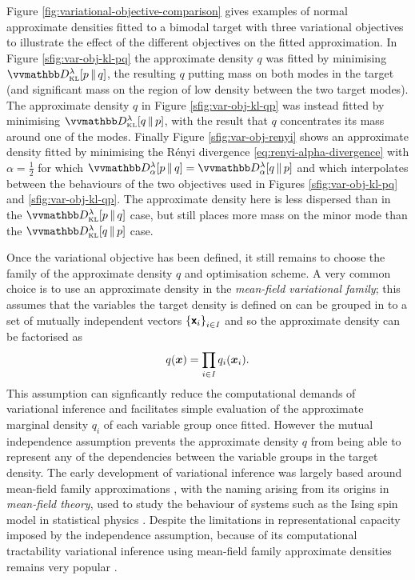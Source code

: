 Figure \ref{fig:variational-objective-comparison} gives examples of normal approximate densities fitted to a bimodal target with three variational objectives to illustrate the effect of the different objectives on the fitted approximation. In Figure \ref{sfig:var-obj-kl-pq} the approximate density $q$ was fitted by minimising $\kldiv[\lambda]{\tgtdens}{q}$, the resulting $q$ putting mass on both modes in the target (and significant mass on the region of low density between the two target modes). The approximate density $q$ in Figure \ref{sfig:var-obj-kl-qp} was instead fitted by minimising $\kldiv[\lambda]{q}{\tgtdens}$, with the result that $q$ concentrates its mass around one of the modes. Finally Figure \ref{sfig:var-obj-renyi} shows an approximate density fitted by minimising the R\'{e}nyi divergence \eqref{eq:renyi-alpha-divergence} with $\alpha = \frac{1}{2}$ for which $\rdiv[\lambda]{\alpha}{\tgtdens}{q} = \rdiv[\lambda]{\alpha}{q}{\tgtdens}$ and which interpolates between the behaviours of the two objectives used in Figures \ref{sfig:var-obj-kl-pq} and \ref{sfig:var-obj-kl-qp}. The approximate density here is less dispersed than in the $\kldiv[\lambda]{\tgtdens}{q}$ case, but still places more mass on the minor mode than the $\kldiv[\lambda]{q}{\tgtdens}$ case.

Once the variational objective has been defined, it still remains to choose the family of the approximate density $q$ and optimisation scheme. 
A very common choice is to use an approximate density in the \emph{mean-field variational family}; this assumes that the variables the target density is defined on can be grouped in to a set of mutually independent vectors $\fset{\rvct{x}_i}_{i\in\set{I}}$ and so the approximate density can be factorised as
\begin{equation}\label{eq:mean-field-variational-family}
  q(\boldsymbol{x}) = \prod_{i\in\mathit{I}} q_i(\boldsymbol{x}_i).
\end{equation}
This assumption can signficantly reduce the computational demands of variational inference and facilitates simple evaluation of the approximate marginal density $q_{i}$ of each variable group once fitted. However the mutual independence assumption prevents the approximate density $q$ from being able to represent any of the dependencies between the variable groups in the target density. The early development of variational inference was largely based around mean-field family approximations \citep{peterson1987mean,saul1996mean}, with the naming arising from its origins in \emph{mean-field theory}, used to study the behaviour of systems such as the Ising spin model in statistical physics \citep{parisi1998statistical}. Despite the limitations in representational capacity imposed by the independence assumption, because of its computational tractability variational inference using mean-field family approximate densities remains very popular \citep{blei2017variational}.

